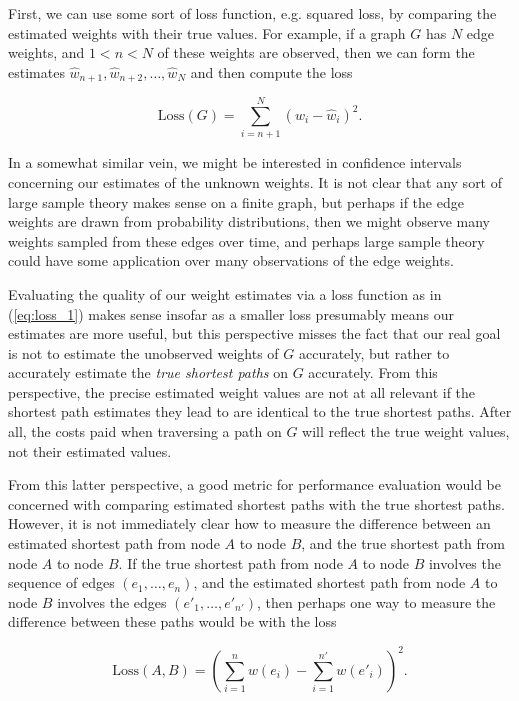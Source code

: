 First, we can use some sort of loss function, e.g. squared loss, by comparing the estimated weights with their true values. For example, if a graph $G$ has $N$ edge weights, and $1 < n < N$ of these weights are observed, then we can form the estimates $\hat w_{n + 1}, \hat w_{n + 2}, \dots, \hat w_N$ and then compute the loss

\begin{equation}\label{eq:loss_1}
    \text{Loss}(G) = \sum_{i = n + 1}^N \left(w_i - \hat w_i\right)^2.
\end{equation}

In a somewhat similar vein, we might be interested in confidence intervals concerning our estimates of the unknown weights. It is not clear that any sort of large sample theory makes sense on a finite graph, but perhaps if the edge weights are drawn from probability distributions, then we might observe many weights sampled from these edges over time, and perhaps large sample theory could have some application over many observations of the edge weights.

Evaluating the quality of our weight estimates via a loss function as in (\ref{eq:loss_1}) makes sense insofar as a smaller loss presumably means our estimates are more useful, but this perspective misses the fact that our real goal is not to estimate the unobserved weights of $G$ accurately, but rather to accurately estimate the \textit{true shortest paths} on $G$ accurately. From this perspective, the precise estimated weight values are not at all relevant if the shortest path estimates they lead to are identical to the true shortest paths. After all, the costs paid when traversing a path on $G$ will reflect the true weight values, not their estimated values.

From this latter perspective, a good metric for performance evaluation would be concerned with comparing estimated shortest paths with the true shortest paths. However, it is not immediately clear how to measure the difference between an estimated shortest path from node $A$ to node $B$, and the true shortest path from node $A$ to node $B$. If the true shortest path from node $A$ to node $B$ involves the sequence of edges $(e_1, \dots, e_n)$, and the estimated shortest path from node $A$ to node $B$ involves the edges $(e'_1, \dots, e'_{n'})$, then perhaps one way to measure the difference between these paths would be with the loss

\[
    \text{Loss}(A, B) = \left(\sum_{i = 1}^n w(e_i) - \sum_{i = 1}^{n'} w(e'_i)\right)^2.
\]

